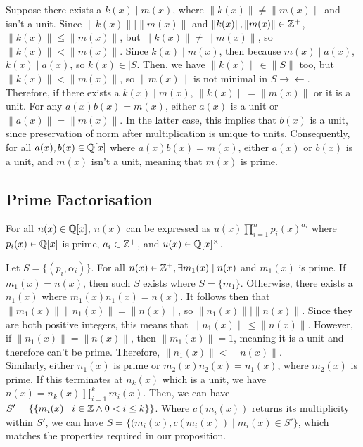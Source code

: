 Suppose there exists a $k(x)\mid m(x)$, where $\|k(x)\|\neq\|m(x)\|$ and isn't a unit. Since $\|k(x)\|\mid \|m(x)\|$ and $\|k(x)\|,\|m(x)\|\in\mathbb{Z}^+$, $ \|k(x)\|\leq \|m(x)\|$, but $\|k(x)\|\neq \|m(x)\|$, so $\|k(x)\|<\|m(x)\|$. Since $k(x)\mid m(x)$, then because $m(x)\mid a(x)$, $k(x)\mid a(x)$, so $k(x)\in|S$. Then, we have $\|k(x)\|\in\|S\|$ too, but $\|k(x)\|<\|m(x)\|$, so $\|m(x)\|$ is not minimal in $S\xrightarrow{}\xleftarrow{}$.\\

Therefore, if there exists a $k(x)\mid m(x)$, $\|k(x)\|=\|m(x)\|$ or it is a unit. For any $a(x)b(x)=m(x)$, either $a(x)$ is a unit or $\|a(x)\|=\|m(x)\|$. In the latter case, this implies that $b(x)$ is a unit, since preservation of norm after multiplication is unique to units. Consequently, for all $a(x),b(x)\in\mathbb{Q}[x]$ where $a(x)b(x)=m(x)$, either $a(x)$ or $b(x)$ is a unit, and $m(x)$ isn't a unit, meaning that $m(x)$ is prime.\\


\subsection{Prime Factorisation}

\begin{theorem}
    For all $n(x) \in \mathbb{Q}[x]$, $n(x)$ can be expressed as $u(x)\prod _{i=1}^n p_i(x)^{\alpha_i}$ where $p_i(x) \in \mathbb{Q}[x]$ is prime, $a_i\in\mathbb{Z}^+$, and $u(x) \in \mathbb{Q}[x]^{\times}$.
\end{theorem}

Let $S= \{(p_i, \alpha_i)\}$. For all $n(x)\in\mathbb{Z}^+,\exists m_1(x)\mid n(x)$ and $m_1(x)$ is prime. If $m_1(x)=n(x)$, then such $S$ exists where $S=\{m_1\}$. Otherwise, there exists a $n_1(x)$ where $m_1(x)n_1(x)=n(x)$. It follows then that $\|m_1(x)\|\|n_1(x)\|=\|n(x)\|$, so $\|n_1(x)\|\mid\|n(x)\|$. Since they are both positive integers, this means that $\|n_1(x)\|\leq\|n(x)\|$. However, if $\|n_1(x)\|=\|n(x)\|$, then $\|m_1(x)\|=1$, meaning it is a unit and therefore can't be prime. Therefore, $\|n_1(x)\|<\|n(x)\|$.\\

Similarly, either $n_1(x)$ is prime or $m_2(x)n_2(x)=n_1(x)$, where $m_2(x)$ is prime. If this terminates at $n_k(x)$ which is a unit, we have $n(x)=n_k(x)\prod_{i=1}^{k}m_i(x)$. Then, we can have $S'=\{\{m_i(x)\mid i\in\mathbb{Z} \land 0<i\leq k\}\}$. Where $c(m_i(x))$ returns its multiplicity within $S'$, we can have $S=\{(m_i(x),c(m_i(x))\mid m_i(x)\in S'\}$, which matches the properties required in our proposition.\\

